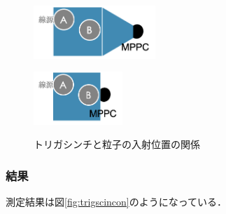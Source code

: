 \begin{figure}[h]
  \centering
  \begin{minipage}[b]{0.45\linewidth}
    \centering
    \includegraphics[height=2cm]{./figure/trigscinwlg.png}
    \label{fig:trigscinwlg}
  \end{minipage}
  \begin{minipage}[b]{0.45\linewidth}
    \centering
    \includegraphics[height=2cm]{./figure/trigscinwolg.png}
    \label{fig:trigscinwolg}
  \end{minipage}
  \caption{トリガシンチと粒子の入射位置の関係}
  \label{fig:trigscinlg}
\end{figure}

\subsubsection*{結果}
測定結果は図\ref{fig:trigscincon}のようになっている．

